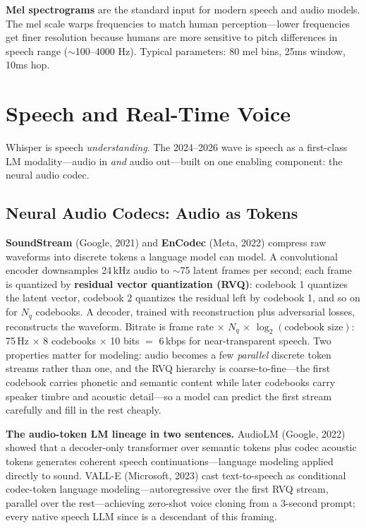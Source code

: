 \textbf{Mel spectrograms} are the standard input for modern speech and audio models. The mel scale warps frequencies to match human perception---lower frequencies get finer resolution because humans are more sensitive to pitch differences in speech range ($\sim$100--4000 Hz). Typical parameters: 80 mel bins, 25ms window, 10ms hop.

\section{Speech and Real-Time Voice}
\label{sec:speech_realtime_voice}

Whisper is speech \textit{understanding}. The 2024--2026 wave is speech as a first-class LM modality---audio in \textit{and} audio out---built on one enabling component: the neural audio codec.

\subsection{Neural Audio Codecs: Audio as Tokens}

\textbf{SoundStream} (Google, 2021) and \textbf{EnCodec} (Meta, 2022) compress raw waveforms into discrete tokens a language model can model. A convolutional encoder downsamples 24\,kHz audio to $\sim$75 latent frames per second; each frame is quantized by \textbf{residual vector quantization (RVQ)}: codebook 1 quantizes the latent vector, codebook 2 quantizes the residual left by codebook 1, and so on for $N_q$ codebooks. A decoder, trained with reconstruction plus adversarial losses, reconstructs the waveform. Bitrate is frame rate $\times$ $N_q$ $\times$ $\log_2(\text{codebook size})$: 75\,Hz $\times$ 8 codebooks $\times$ 10 bits $=$ 6\,kbps for near-transparent speech. Two properties matter for modeling: audio becomes a few \textit{parallel} discrete token streams rather than one, and the RVQ hierarchy is coarse-to-fine---the first codebook carries phonetic and semantic content while later codebooks carry speaker timbre and acoustic detail---so a model can predict the first stream carefully and fill in the rest cheaply.

\textbf{The audio-token LM lineage in two sentences.} AudioLM (Google, 2022) showed that a decoder-only transformer over semantic tokens plus codec acoustic tokens generates coherent speech continuations---language modeling applied directly to sound. VALL-E (Microsoft, 2023) cast text-to-speech as conditional codec-token language modeling---autoregressive over the first RVQ stream, parallel over the rest---achieving zero-shot voice cloning from a 3-second prompt; every native speech LLM since is a descendant of this framing.

